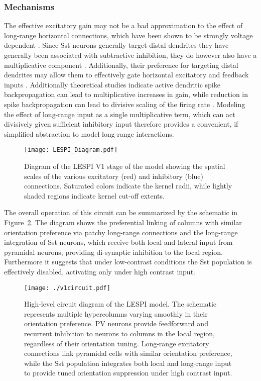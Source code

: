 \subsubsection{Mechanisms}

The effective excitatory gain may not be a bad approximation to the
effect of long-range horizontal connections, which have been shown to
be strongly voltage dependent \citep{Hirsch1991}. Since Sst neurons
generally target distal dendrites they have generally been associated
with subtractive inhibition, they do however also have a
multiplicative component \citep{Wilson2012}. Additionally, their
preference for targeting distal dendrites may allow them to
effectively gate horizontal excitatory and feedback inputs
\citep{Ma2011, Gentet2012}. Additionally theoretical studies indicate
active dendritic spike backpropagation can lead to multiplicative
increases in gain, while reduction in spike backpropagation can lead
to divisive scaling of the firing rate \citep{Mehaffey2005}. Modeling
the effect of long-range input as a single multiplicative term, which
can act divisively given sufficient inhibitory input therefore
provides a convenient, if simplified abstraction to model long-range
interactions.

\begin{figure}
	\centering
        \texttt{[image: LESPI\_Diagram.pdf]}
	\caption{Diagram of the LESPI V1 stage of the model showing the
      spatial scales of the various excitatory (red) and inhibitory
      (blue) connections. Saturated colors indicate the kernel radii,
      while lightly shaded regions indicate kernel cut-off extents.}
	\label{LESPIDiagram}
\end{figure}

The overall operation of this circuit can be summarized by the
schematic in Figure~\ref{circuit_diagram}. The diagram shows the
preferential linking of columns with similar orientation preference
via patchy long-range connections and the long-range integration of
Sst neurons, which receive both local and lateral input from pyramidal
neurons, providing di-synaptic inhibition to the local
region. Furthermore it suggests that under low-contrast conditions the
Sst population is effectively disabled, activating only under high
contrast input.

\begin{figure}
	\centering
	\texttt{[image: ./v1circuit.pdf]}
	\caption[High-level circuit diagram of the LESPI
      model.]{High-level circuit diagram of the LESPI model. The
      schematic represents multiple hypercolumns varying smoothly in
      their orientation preference. PV neurons provide feedforward and
      recurrent inhibition to neurons to columns in the local region,
      regardless of their orientation tuning. Long-range excitatory
      connections link pyramidal cells with similar orientation
      preference, while the Sst population integrates both local and
      long-range input to provide tuned orientation suppression under
      high contrast input.}
    \label{circuit_diagram}
\end{figure}

